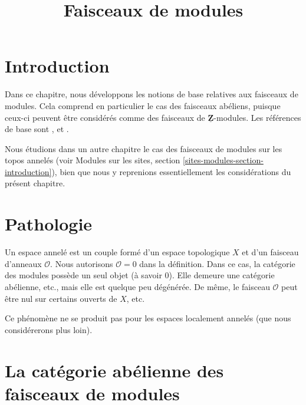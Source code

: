 

%


\title{Faisceaux de modules}


\maketitle

\label{section-phantom}

\tableofcontents

\section{Introduction}
\label{section-introduction}

\noindent
Dans ce chapitre, nous développons les notions de base relatives aux faisceaux
de modules. Cela comprend en particulier le cas des faisceaux abéliens, puisque
ceux-ci peuvent être considérés comme des faisceaux de
$\underline{\mathbf{Z}}$-modules. Les références de base sont
\cite{FAC}, \cite{EGA} et \cite{SGA4}.

\medskip\noindent
Nous étudions dans un autre chapitre le cas des faisceaux de modules sur les
topos annelés (voir Modules sur les sites, section
\ref{sites-modules-section-introduction}), bien que nous y reprenions
essentiellement les considérations du présent chapitre.





\section{Pathologie}
\label{section-pathology}

\noindent
Un espace annelé est un couple formé d'un espace topologique $X$ et d'un
faisceau d'anneaux $\mathcal{O}$. Nous autorisons $\mathcal{O} = 0$ dans
la définition. Dans ce cas, la catégorie des modules possède un seul objet
(à savoir $0$). Elle demeure une catégorie abélienne, etc., mais elle est
quelque peu dégénérée. De même, le faisceau $\mathcal{O}$ peut être nul
sur certains ouverts de $X$, etc.

\medskip\noindent
Ce phénomène ne se produit pas pour les espaces localement annelés (que nous
considérerons plus loin).








\section{La catégorie abélienne des faisceaux de modules}
\label{section-kernels}

